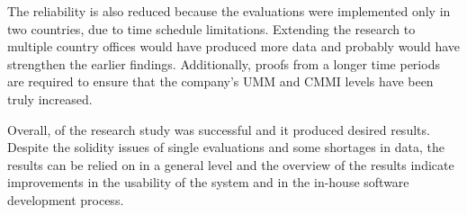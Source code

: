 \documentclass[12pt,a4paper,oneside,pdftex]{report}
\begin{document}
The reliability is also reduced because the evaluations were implemented only in two countries, due to time schedule limitations. Extending the research to multiple country offices would have produced more data and probably would have strengthen the earlier findings. Additionally, proofs from a longer time periods are required to ensure that the company's UMM and CMMI levels have been truly increased.


Overall, of the research study was successful and it produced desired results. Despite the solidity issues of single evaluations and some shortages in data, the results can be relied on in a general level and the overview of the results indicate improvements in the usability of the system and in the in-house software development process.


\end{document}
